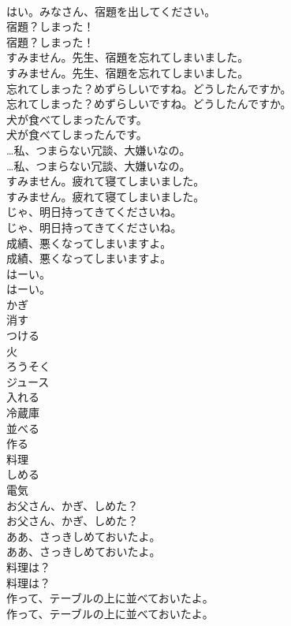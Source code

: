 \documentclass[8pt]{extreport}
\begin{document}
\begin{CJK}{UTF8}{min}
\\	はい。みなさん、宿題を出してください。 
\\	宿題？しまった！	
\\	宿題？しまった！ 
\\	すみません。先生、宿題を忘れてしまいました。	
\\	すみません。先生、宿題を忘れてしまいました。 
\\	忘れてしまった？めずらしいですね。どうしたんですか。	
\\	忘れてしまった？めずらしいですね。どうしたんですか。 
\\	犬が食べてしまったんです。	
\\	犬が食べてしまったんです。 
\\	…私、つまらない冗談、大嫌いなの。	
\\	…私、つまらない冗談、大嫌いなの。 
\\	すみません。疲れて寝てしまいました。	
\\	すみません。疲れて寝てしまいました。 
\\	じゃ、明日持ってきてくださいね。	
\\	じゃ、明日持ってきてくださいね。 
\\	成績、悪くなってしまいますよ。	
\\	成績、悪くなってしまいますよ。 
\\	はーい。	
\\	はーい。 
\\	かぎ
\\	消す
\\	つける
\\	火
\\	ろうそく
\\	ジュース
\\	入れる
\\	冷蔵庫
\\	並べる
\\	作る
\\	料理
\\	しめる
\\	電気
\\	お父さん、かぎ、しめた？	
\\	お父さん、かぎ、しめた？ 
\\	ああ、さっきしめておいたよ。	
\\	ああ、さっきしめておいたよ。 
\\	料理は？	
\\	料理は？ 
\\	作って、テーブルの上に並べておいたよ。	
\\	作って、テーブルの上に並べておいたよ。 

\end{CJK}
\end{document}

